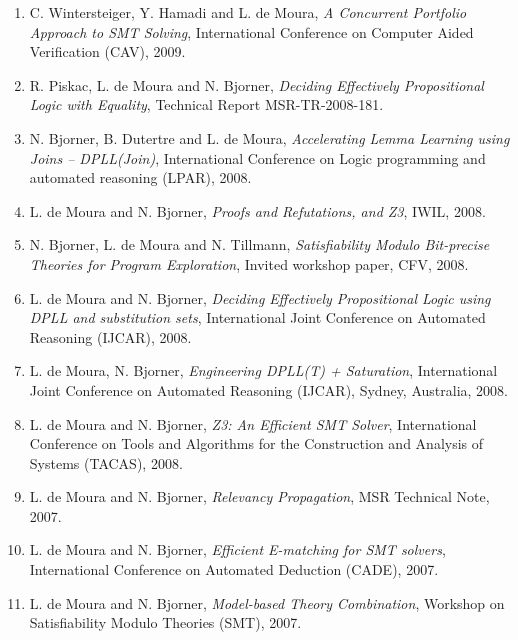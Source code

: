 \documentclass[11pt,a4paper]{article}
\begin{document}
\begin{enumerate}[leftmargin=*,itemsep=0.5ex,topsep=0.6ex]
\item C. Wintersteiger, Y. Hamadi and L. de Moura,
      {\em A Concurrent Portfolio Approach to SMT Solving},
      International Conference on Computer Aided Verification (CAV), 2009.

\item R. Piskac, L. de Moura and N. Bjorner,
      {\em Deciding Effectively Propositional Logic with Equality},
      Technical Report MSR-TR-2008-181.

\item N. Bjorner, B. Dutertre and L. de Moura,
      {\em Accelerating Lemma Learning using Joins -- DPLL(Join)},
      International Conference on Logic programming and automated reasoning (LPAR), 2008.

\item L. de Moura and N. Bjorner,
      {\em Proofs and Refutations, and Z3},
      IWIL, 2008.

\item N. Bjorner, L. de Moura and N. Tillmann,
      {\em Satisfiability Modulo Bit-precise Theories for Program Exploration},
      Invited workshop paper, CFV, 2008.

\item L. de Moura and N. Bjorner,
      {\em Deciding Effectively Propositional Logic using DPLL and substitution sets},
      International Joint Conference on Automated Reasoning (IJCAR), 2008.

\item L. de Moura, N. Bjorner,
      {\em Engineering DPLL(T) + Saturation},
      International Joint Conference on Automated Reasoning (IJCAR), Sydney, Australia, 2008.

\item L. de Moura and N. Bjorner,
      {\em Z3: An Efficient SMT Solver},
      International Conference on Tools and Algorithms for the Construction and Analysis of Systems (TACAS), 2008.

\item L. de Moura and N. Bjorner,
      {\em Relevancy Propagation}, MSR Technical Note, 2007.

\item L. de Moura and N. Bjorner,
      {\em Efficient E-matching for SMT solvers},
      International Conference on Automated Deduction (CADE), 2007.

\item L. de Moura and N. Bjorner,
      {\em Model-based Theory Combination},
      Workshop on Satisfiability Modulo Theories (SMT), 2007.


\end{enumerate}
\end{document}
